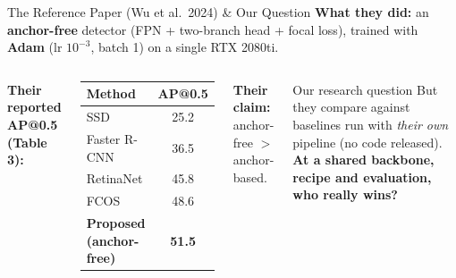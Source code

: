 \documentclass[aspectratio=169,11pt]{beamer}
\newcommand{\hl}[1]{\textcolor{polimi}{\textbf{#1}}}
\begin{document}
\begin{frame}{The Reference Paper (Wu et al.\ 2024) \& Our Question}
  \small
  \textbf{What they did:} an \hl{anchor-free} detector (FPN + two-branch head + focal loss),
  trained with \hl{Adam} (lr $10^{-3}$, batch 1) on a single RTX 2080ti.
  \vspace{0.4em}
  \begin{columns}[T]
      \textbf{Their reported AP@0.5 (Table 3):}
      \begin{center}\footnotesize
      \begin{tabular}{lc}
        \toprule
        Method & AP@0.5 \\ \midrule
        SSD & 25.2 \\
        Faster R-CNN & 36.5 \\
        RetinaNet & 45.8 \\
        FCOS & 48.6 \\
        \textbf{Proposed (anchor-free)} & \textbf{51.5} \\
        \bottomrule
      \end{tabular}
      \end{center}
      \textbf{Their claim:} anchor-free $>$ anchor-based.
      \vspace{0.5em}
      \begin{block}{\small Our research question}
        \small But they compare against baselines run with \emph{their own} pipeline (no code
        released). \hl{At a shared backbone, recipe and evaluation, who really wins?}
      \end{block}
  \end{columns}
\end{frame}
\end{document}
